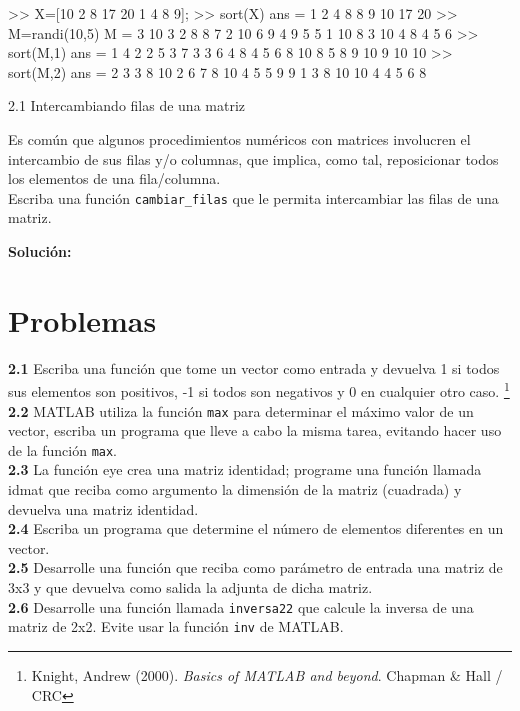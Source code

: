 \begin{matlab}
>> X=[10 2 8 17 20 1 4 8 9];
>> sort(X)
ans =
     1     2     4     8     8     9    10    17    20
>> M=randi(10,5)
M =
     3    10     3     2     8
     8     7     2    10     6
     9     4     9     5     5
     1    10     8     3    10
     4     8     4     5     6
>> sort(M,1) %
ans =
     1     4     2     2     5
     3     7     3     3     6
     4     8     4     5     6
     8    10     8     5     8
     9    10     9    10    10
>> sort(M,2) %
ans =
     2     3     3     8    10
     2     6     7     8    10
     4     5     5     9     9
     1     3     8    10    10
     4     4     5     6     8
\end{matlab}


\begin{ejemplo}{2.1 Intercambiando filas de una matriz}

Es común que algunos procedimientos numéricos con matrices involucren el 
intercambio de sus filas y/o columnas, que implica, como tal, reposicionar 
todos los elementos de una fila/columna.\\

Escriba una función \texttt{cambiar\_filas} que le permita intercambiar 
las filas de una matriz. 

\textbf{Solución:}



\end{ejemplo}

\section{Problemas}\label{problemas}

\textbf{2.1} Escriba una función que tome un vector como entrada y
devuelva 1 si todos sus elementos son positivos, -1 si todos son
negativos y 0 en cualquier otro caso. \footnote{Knight, Andrew (2000).
  \emph{Basics of MATLAB and beyond}. Chapman \& Hall / CRC} \\

\textbf{2.2} MATLAB utiliza la función \texttt{max} para determinar el
máximo valor de un vector, escriba un programa que lleve a cabo la misma
tarea, evitando hacer uso de la función \texttt{max}. \\

\textbf{2.3} La función eye crea una matriz identidad; programe una
función llamada idmat que reciba como argumento la dimensión de la
matriz (cuadrada) y devuelva una matriz identidad. \\

\textbf{2.4} Escriba un programa que determine el número de elementos
diferentes en un vector. \\

\textbf{2.5} Desarrolle una función que reciba como parámetro de entrada
una matriz de 3x3 y que devuelva como salida la adjunta de dicha matriz. \\

\textbf{2.6} Desarrolle una función llamada \texttt{inversa22} que
calcule la inversa de una matriz de 2x2. Evite usar la función
\texttt{inv} de MATLAB.

